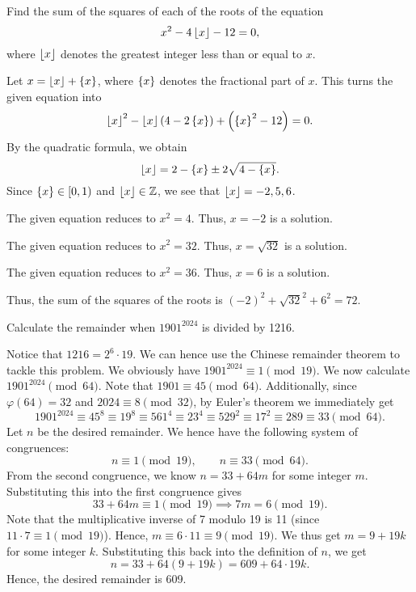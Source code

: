 \begin{question}[72]\label{Q::2024-S-1-19}
    Find the sum of the squares of each of the roots of the equation \[x^2 - 4\left\lfloor x \right\rfloor - 12 = 0,\] where $\left\lfloor x \right\rfloor$ denotes the greatest integer less than or equal to $x$.
\end{question}
\begin{solution*}
    Let $x = \left\lfloor x \right\rfloor + \left\lbrace x \right\rbrace$, where $\left\lbrace x \right\rbrace$ denotes the fractional part of $x$. This turns the given equation into \[\left\lfloor x \right\rfloor^2 - \left\lfloor x \right\rfloor\left( 4 - 2\left\lbrace x \right\rbrace \right) + \left( \left\lbrace x \right\rbrace^2 - 12 \right) = 0.\] By the quadratic formula, we obtain \[\left\lfloor x \right\rfloor = 2 - \left\lbrace x \right\rbrace \pm 2\sqrt{4 - \left\lbrace x \right\rbrace}.\] Since $\left\lbrace x \right\rbrace \in [0, 1)$ and $\left\lfloor x \right\rfloor \in \mathbb{Z}$, we see that $\left\lfloor x \right\rfloor = -2, 5, 6$.

     The given equation reduces to $x^2 = 4$. Thus, $x = -2$ is a solution.

     The given equation reduces to $x^2 = 32$. Thus, $x = \sqrt{32}$ is a solution.

     The given equation reduces to $x^2 = 36$. Thus, $x = 6$ is a solution.

    Thus, the sum of the squares of the roots is $(-2)^2 + \sqrt{32}^2 + 6^2 = 72$.
\end{solution*}

\begin{question}[609]\label{Q::2024-S-1-20}
    Calculate the remainder when $1901^{2024}$ is divided by 1216.
\end{question}
\begin{solution*}
    Notice that $1216 = 2^6 \cdot 19$. We can hence use the Chinese remainder theorem to tackle this problem. We obviously have $1901^{2024} \equiv 1 \pmod{19}$. We now calculate $1901^{2024} \pmod{64}$. Note that $1901 \equiv 45 \pmod{64}$. Additionally, since $\varphi(64) = 32$ and $2024 \equiv 8 \pmod{32}$, by Euler's theorem we immediately get \[1901^{2024} \equiv 45^8 \equiv 19^8 \equiv 561^4 \equiv 23^4 \equiv 529^2 \equiv 17^2 \equiv 289 \equiv 33  \pmod{64}.\] Let $n$ be the desired remainder. We hence have the following system of congruences: \[n \equiv 1 \pmod{19}, \qquad n \equiv 33 \pmod{64}.\] From the second congruence, we know $n = 33 + 64m$ for some integer $m$. Substituting this into the first congruence gives \[33 + 64m \equiv 1 \pmod{19} \implies 7m = 6 \pmod{19}.\] Note that the multiplicative inverse of 7 modulo 19 is 11 (since $11 \cdot 7 \equiv 1 \pmod{19}$). Hence, $m \equiv 6 \cdot 11 \equiv 9 \pmod{19}$. We thus get $m = 9 + 19k$ for some integer $k$. Substituting this back into the definition of $n$, we get \[n = 33 + 64(9 + 19k) = 609 + 64 \cdot 19k.\] Hence, the desired remainder is 609.
\end{solution*}

